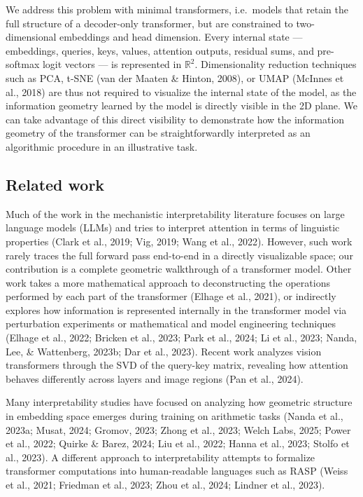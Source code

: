 \documentclass[
  11pt,
  a4paper,
]{article}
\begin{document}
We address this problem with minimal transformers, i.e.~models that
retain the full structure of a decoder-only transformer, but are
constrained to two-dimensional embeddings and head dimension. Every
internal state --- embeddings, queries, keys, values, attention outputs,
residual sums, and pre-softmax logit vectors --- is represented in
\(\mathbb{R}^2\). Dimensionality reduction techniques such as PCA, t-SNE
(van der Maaten \& Hinton, 2008), or UMAP (McInnes et al., 2018) are
thus not required to visualize the internal state of the model, as the
information geometry learned by the model is directly visible in the 2D
plane. We can take advantage of this direct visibility to demonstrate
how the information geometry of the transformer can be straightforwardly
interpreted as an algorithmic procedure in an illustrative task.

\subsection{Related work}\label{related-work}

Much of the work in the mechanistic interpretability literature focuses
on large language models (LLMs) and tries to interpret attention in
terms of linguistic properties (Clark et al., 2019; Vig, 2019; Wang et
al., 2022). However, such work rarely traces the full forward pass
end-to-end in a directly visualizable space; our contribution is a
complete geometric walkthrough of a transformer model. Other work takes
a more mathematical approach to deconstructing the operations performed
by each part of the transformer (Elhage et al., 2021), or indirectly
explores how information is represented internally in the transformer
model via perturbation experiments or mathematical and model engineering
techniques (Elhage et al., 2022; Bricken et al., 2023; Park et al.,
2024; Li et al., 2023; Nanda, Lee, \& Wattenberg, 2023b; Dar et al.,
2023). Recent work analyzes vision transformers through the SVD of the
query-key matrix, revealing how attention behaves differently across
layers and image regions (Pan et al., 2024).

Many interpretability studies have focused on analyzing how geometric
structure in embedding space emerges during training on arithmetic tasks
(Nanda et al., 2023a; Musat, 2024; Gromov, 2023; Zhong et al., 2023;
Welch Labs, 2025; Power et al., 2022; Quirke \& Barez, 2024; Liu et al.,
2022; Hanna et al., 2023; Stolfo et al., 2023). A different approach to
interpretability attempts to formalize transformer computations into
human-readable languages such as RASP (Weiss et al., 2021; Friedman et
al., 2023; Zhou et al., 2024; Lindner et al., 2023).
\end{document}
